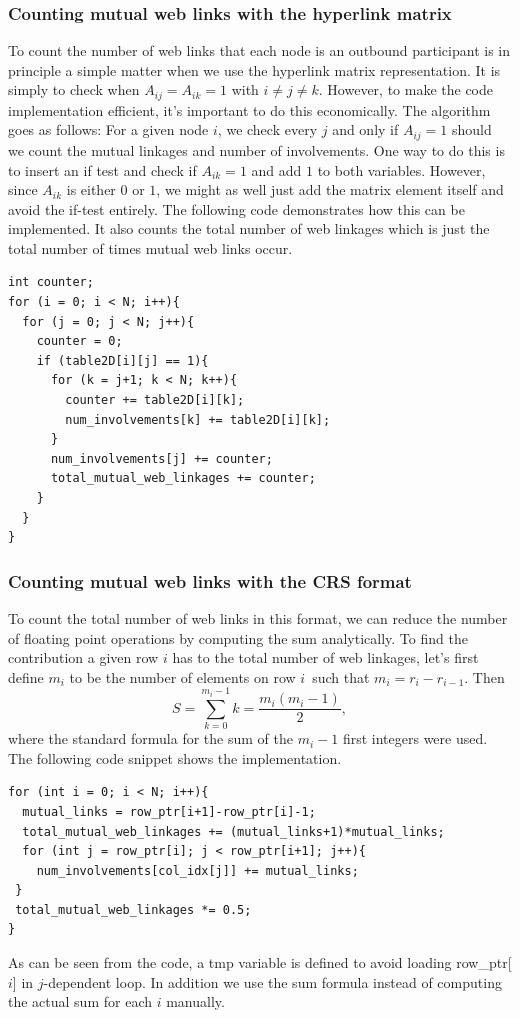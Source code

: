 \documentclass[english,notitlepage, reprint]{revtex4-1}  %
\begin{document}
\subsubsection{Counting mutual web links with the hyperlink matrix}
To count the number of web links that each node is an outbound participant is in principle a simple matter when we use the hyperlink matrix representation. It is simply to check when $A_{ij} = A_{ik} = 1$ with $i\neq j \neq k$. However, to make the code implementation efficient, it's important to do this economically. The algorithm goes as follows: For a given node $i$, we check every $j$ and only if $A_{ij} = 1$ should we count the mutual linkages and number of involvements. One way to do this is to insert an if test and check if $A_{ik} = 1$ and add $1$ to both variables. However, since $A_{ik}$ is either $0$ or $1$, we might as well just add the matrix element itself and avoid the if-test entirely. The following code demonstrates how this can be implemented. It also counts the total number of web linkages
which is just the total number of times mutual web links occur.

\begin{lstlisting}[style=customc]
int counter;
for (i = 0; i < N; i++){
  for (j = 0; j < N; j++){
    counter = 0;
    if (table2D[i][j] == 1){
      for (k = j+1; k < N; k++){
        counter += table2D[i][k];
        num_involvements[k] += table2D[i][k];
      }
      num_involvements[j] += counter;
      total_mutual_web_linkages += counter;
    }
  }
}
\end{lstlisting}

\subsubsection{Counting mutual web links with the CRS format}
To count the total number of web links in this format, we can reduce the number of floating point operations by computing the sum analytically. To find the contribution a given row $i$ has to the total number of web linkages, let's first define $m_i$ to be the number of elements on row $i$ such that $m_i = r_i - r_{i-1}$. Then
\begin{equation}
    S = \sum_{k = 0}^{m_i-1} k = \frac{m_i(m_i-1)}{2},
\end{equation}
where the standard formula for the sum of the $m_i-1$ first integers were used. The following code snippet shows the implementation.

\begin{lstlisting}[style=customc]
for (int i = 0; i < N; i++){
  mutual_links = row_ptr[i+1]-row_ptr[i]-1;
  total_mutual_web_linkages += (mutual_links+1)*mutual_links;
  for (int j = row_ptr[i]; j < row_ptr[i+1]; j++){
    num_involvements[col_idx[j]] += mutual_links;
 }
 total_mutual_web_linkages *= 0.5;
}
\end{lstlisting}
As can be seen from the code, a tmp variable is defined to avoid loading row\_ptr[$i$] in $j$-dependent loop. In addition we use the sum formula instead of computing the actual sum for each $i$ manually.
\end{document}
